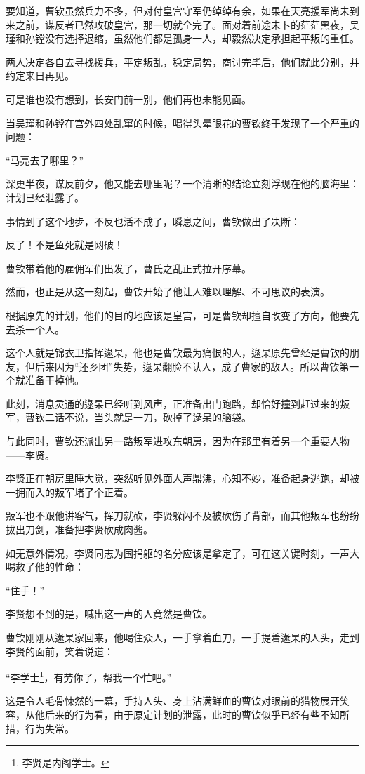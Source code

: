 \begin{multicols}{\theparacolNo}
要知道，曹钦虽然兵力不多，但对付皇宫守军仍绰绰有余，如果在天亮援军尚未到来之前，谋反者已然攻破皇宫，那一切就全完了。面对着前途未卜的茫茫黑夜，吴瑾和孙镗没有选择退缩，虽然他们都是孤身一人，却毅然决定承担起平叛的重任。

两人决定各自去寻找援兵，平定叛乱，稳定局势，商讨完毕后，他们就此分别，并约定来日再见。

可是谁也没有想到，长安门前一别，他们再也未能见面。

当吴瑾和孙镗在宫外四处乱窜的时候，喝得头晕眼花的曹钦终于发现了一个严重的问题：

“马亮去了哪里？”

深更半夜，谋反前夕，他又能去哪里呢？一个清晰的结论立刻浮现在他的脑海里：计划已经泄露了。

事情到了这个地步，不反也活不成了，瞬息之间，曹钦做出了决断：

反了！不是鱼死就是网破！

曹钦带着他的雇佣军们出发了，曹氏之乱正式拉开序幕。

然而，也正是从这一刻起，曹钦开始了他让人难以理解、不可思议的表演。

根据原先的计划，他们的目的地应该是皇宫，可是曹钦却擅自改变了方向，他要先去杀一个人。

这个人就是锦衣卫指挥逯杲，他也是曹钦最为痛恨的人，逯杲原先曾经是曹钦的朋友，但后来因为“还乡团”失势，逯杲翻脸不认人，成了曹家的敌人。所以曹钦第一个就准备干掉他。

此刻，消息灵通的逯杲已经听到风声，正准备出门跑路，却恰好撞到赶过来的叛军，曹钦二话不说，当头就是一刀，砍掉了逯杲的脑袋。

与此同时，曹钦还派出另一路叛军进攻东朝房，因为在那里有着另一个重要人物——李贤。

李贤正在朝房里睡大觉，突然听见外面人声鼎沸，心知不妙，准备起身逃跑，却被一拥而入的叛军堵了个正着。

叛军也不跟他讲客气，挥刀就砍，李贤躲闪不及被砍伤了背部，而其他叛军也纷纷拔出刀剑，准备把李贤砍成肉酱。

如无意外情况，李贤同志为国捐躯的名分应该是拿定了，可在这关键时刻，一声大喝救了他的性命：

“住手！”

李贤想不到的是，喊出这一声的人竟然是曹钦。

曹钦刚刚从逯杲家回来，他喝住众人，一手拿着血刀，一手提着逯杲的人头，走到李贤的面前，笑着说道：

“李学士\footnote{李贤是内阁学士。}，有劳你了，帮我一个忙吧。”

这是令人毛骨悚然的一幕，手持人头、身上沾满鲜血的曹钦对眼前的猎物展开笑容，从他后来的行为看，由于原定计划的泄露，此时的曹钦似乎已经有些不知所措，行为失常。


\end{multicols}
